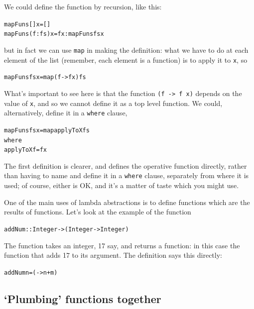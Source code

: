 We could define the function by recursion, like this:
\begin{alltt}
mapFuns [] x     = []
mapFuns (f:fs) x = f x : mapFuns fs x
\end{alltt}
but in fact we can use \texttt{map} in making the definition: what we have to do at each element of the list (remember, each element is a function) is to apply it to \texttt{x}, so
\begin{alltt}
mapFuns fs x = map (\bs{}f -> f x) fs
\end{alltt}
What's important to see here is that the function \texttt{(\bs{}f -> f x)} depends on the  value of \texttt{x}, and so we cannot define it as a top level function. We could, alternatively, define it in a \texttt{where} clause,
\begin{alltt}
mapFuns fs x = map applyToX fs
			   where
			   applyToX f = f x
\end{alltt}
The first definition is clearer, and defines the operative function directly, rather than having to name and define it in a \texttt{where} clause, separately from where it is used; of course, either is OK, and it's a matter of taste which you might use.  

One of the main uses of lambda abstractions is to define functions which are the results of functions. Let's look at the example of the function
\begin{alltt}
addNum :: Integer -> (Integer -> Integer)
\end{alltt}
The function takes an integer, 17 say, and returns a function: in this case the function that adds 17 to its argument. The definition says this directly:
\minx{->}
\begin{alltt}
addNum n = ( -> n+m)
\end{alltt}

\subsection*{`Plumbing' functions together}

